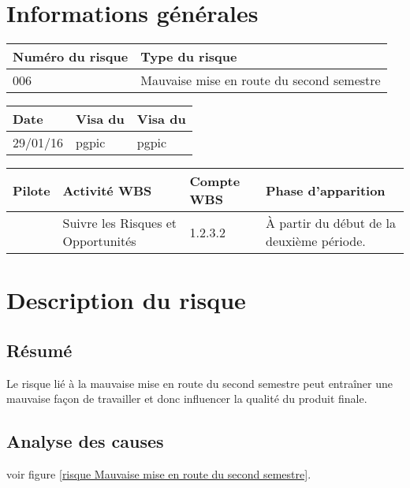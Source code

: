 
\section*{Informations générales}

\begin{table}[H]
\centering
	\begin{tabularx}{16.8cm}{|X|X|}
	\hline
	\rowcolor{gray!40} Numéro du risque & Type du risque \\
	\hline
	006 & Mauvaise mise en route du second semestre \\
	\hline
	\end{tabularx}
\end{table}

\begin{table}[H]
\centering
	\begin{tabularx}{16.8cm}{|X|X|X|}
	\hline
	\rowcolor{gray!40} Date & Visa du \RQ & Visa du \CP \\
	\hline
	 29/01/16 & pgpic & pgpic \\
	\hline
	\end{tabularx}
\end{table}

\begin{table}[H]
\centering
	\begin{tabularx}{16.8cm}{|X|X|X|X|}
	\hline
	\rowcolor{gray!40} Pilote & Activité WBS & Compte WBS & Phase d'apparition \\
	\hline
	 \Melissa & Suivre les Risques et Opportunités & 1.2.3.2 & À partir du début de la deuxième période. \\
	\hline
	\end{tabularx}
\end{table}

\section*{Description du risque}

\subsection*{Résumé}
	Le risque lié à la mauvaise mise en route du second semestre peut entraîner une mauvaise façon de travailler et donc influencer la qualité du produit finale.
	
\subsection*{Analyse des causes}
	voir figure \ref{risque Mauvaise mise en route du second semestre}.


